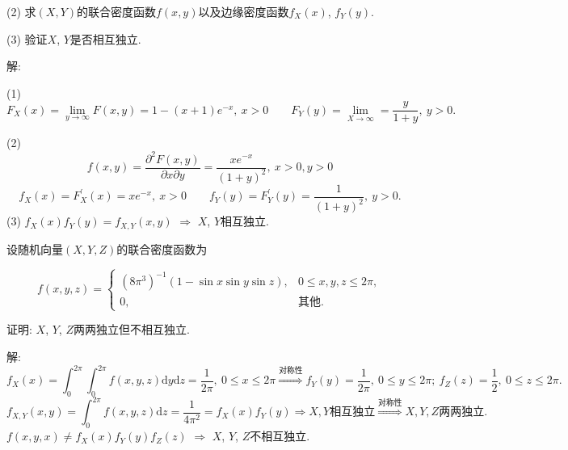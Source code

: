\documentclass[standard]{ExBook}
\begin{document}
\begin{qitems}
\begin{bbox}
\begin{shaded}
(2) 求$(X,Y)$的联合密度函数$f(x,y)$以及边缘密度函数$f_{X}(x)$, $f_{Y}(y)$.

(3) 验证$X$, $Y$是否相互独立.
    \end{shaded}
    \end{bbox}

\vspace{-5em}

    \begin{bbox}
解: 

(1)
$$F_{X}(x)=\lim\limits_{y\to\infty}F(x,y)=1-(x+1)e^{-x},\ x>0\qquad F_{Y}(y)=\lim\limits_{X\to\infty}=\frac{y}{1+y},\ y>0.$$

(2)
$$f(x,y)=\frac{\partial^2 F(x,y)}{\partial x\partial y}=\frac{x e^{-x}}{(1+y)^2},\ x>0,y>0$$
$$f_{X}(x)=F_{X}^{'}(x)=x e^{-x},\ x>0\qquad f_{Y}(y)=F_{Y}^{'}(y)=\frac{1}{(1+y)^2},\ y>0.$$
(3) $f_{X}(x)f_{Y}(y)=f_{X,Y}(x,y)$ $\Longrightarrow$ $X$, $Y$相互独立.
    \end{bbox}

\vspace{-5em}

    \begin{bbox}
    \begin{shaded}
        \qitem
设随机向量$(X,Y,Z)$的联合密度函数为
\vspace{-2em}
\begin{center}
\begin{equation}
    f(x,y,z)=
    \left\{
    \begin{array}{cl}
        \nonumber
        (8\pi^{3})^{-1}(1-\sin x\sin y\sin z), & 0\leq x,y,z\leq2\pi,\\
        0, & \text{其他}.
    \end{array}
    \right.
\end{equation}
\end{center}
证明: $X$, $Y$, $Z$两两独立但不相互独立.
    \end{shaded}
    \end{bbox}

\vspace{-5em}

    \begin{bbox}
解: 
$$f_{X}(x)=\int_{0}^{2\pi}\int_{0}^{2\pi}f(x,y,z)\mathrm{d}y\mathrm{d}z=\frac{1}{2\pi},\ 0\leq x\leq 2\pi \overset{\text{对称性}}{\Longrightarrow} f_{Y}(y)=\frac{1}{2\pi},\ 0\leq y\leq 2\pi;\ f_{Z}(z)=\frac{1}{2},\ 0\leq z\leq 2\pi.$$
$$f_{X,Y}(x,y)=\int_{0}^{2\pi}f(x,y,z)\mathrm{d}z=\frac{1}{4\pi^2}=f_{X}(x)f_{Y}(y) \Longrightarrow X,Y\text{相互独立} \overset{\text{对称性}}{\Longrightarrow} X,Y,Z\text{两两独立}.$$
$f(x,y,x)\neq f_{X}(x)f_{Y}(y)f_{Z}(z)$ $\Longrightarrow$ $X$, $Y$, $Z$不相互独立.
    \end{bbox}


\end{qitems}
\end{document}
